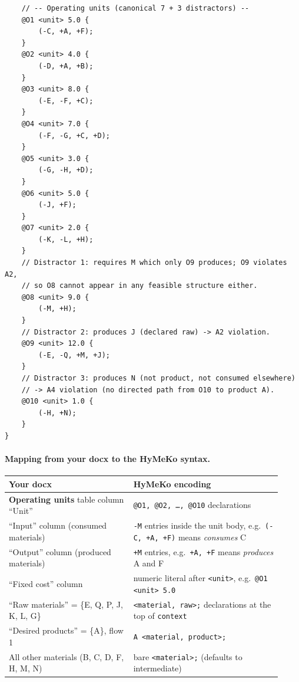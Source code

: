 \documentclass[11pt]{article}
\begin{document}
\begin{lstlisting}
    // -- Operating units (canonical 7 + 3 distractors) --
    @O1 <unit> 5.0 {
        (-C, +A, +F);
    }
    @O2 <unit> 4.0 {
        (-D, +A, +B);
    }
    @O3 <unit> 8.0 {
        (-E, -F, +C);
    }
    @O4 <unit> 7.0 {
        (-F, -G, +C, +D);
    }
    @O5 <unit> 3.0 {
        (-G, -H, +D);
    }
    @O6 <unit> 5.0 {
        (-J, +F);
    }
    @O7 <unit> 2.0 {
        (-K, -L, +H);
    }
    // Distractor 1: requires M which only O9 produces; O9 violates A2,
    // so O8 cannot appear in any feasible structure either.
    @O8 <unit> 9.0 {
        (-M, +H);
    }
    // Distractor 2: produces J (declared raw) -> A2 violation.
    @O9 <unit> 12.0 {
        (-E, -Q, +M, +J);
    }
    // Distractor 3: produces N (not product, not consumed elsewhere)
    // -> A4 violation (no directed path from O10 to product A).
    @O10 <unit> 1.0 {
        (-H, +N);
    }
}
\end{lstlisting}

\paragraph{Mapping from your docx to the HyMeKo syntax.}

\begin{table}[h]
\centering
\small
\begin{tabular}{p{0.42\linewidth}p{0.50\linewidth}}
\toprule
Your docx & HyMeKo encoding \\
\midrule
\textbf{Operating units} table column ``Unit'' & \texttt{@O1, @O2, \ldots, @O10} declarations \\
``Input'' column (consumed materials) & \texttt{-M} entries inside the unit body, e.g.\ \texttt{(-C, +A, +F)} means \emph{consumes} C \\
``Output'' column (produced materials) & \texttt{+M} entries, e.g.\ \texttt{+A, +F} means \emph{produces} A and F \\
``Fixed cost'' column & numeric literal after \texttt{<unit>}, e.g.\ \texttt{@O1 <unit> 5.0} \\
``Raw materials'' = \{E, Q, P, J, K, L, G\} & \texttt{<material, raw>;} declarations at the top of \texttt{context} \\
``Desired products'' = \{A\}, flow 1 & \texttt{A <material, product>;} \\
All other materials (B, C, D, F, H, M, N) & bare \texttt{<material>;} (defaults to intermediate) \\
\bottomrule
\end{tabular}
\end{table}
\end{document}
